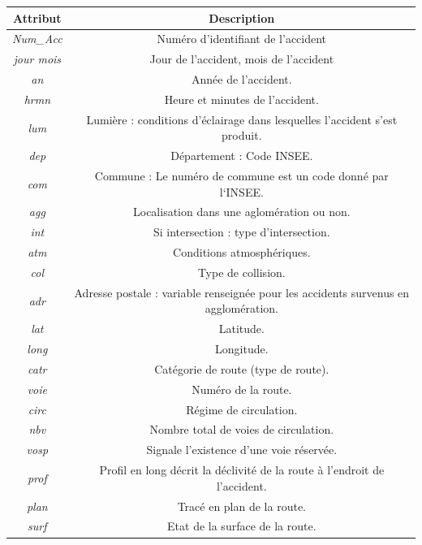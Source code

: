 \documentclass[]{article}
\begin{document}
    \begin{center}
        \begin{tabular}{ |c|c| }
            \hline
            \textbf{Attribut} & \textbf{Description} \\
            \hline
            \textit{Num\_Acc} & Numéro d'identifiant de l'accident \\
            \textit{jour mois} & Jour de l'accident, mois de l'accident \\
            \textit{an} & Année de l'accident. \\
            \textit{hrmn} & Heure et minutes de l'accident. \\
            \textit{lum} & Lumière : conditions d’éclairage dans lesquelles l'accident s'est produit. \\
            \textit{dep} & Département : Code INSEE. \\
            \textit{com} & Commune : Le numéro de commune est un code donné par l‘INSEE. \\
            \textit{agg} & Localisation dans une aglomération ou non. \\
            \textit{int} & Si intersection : type d'intersection. \\
            \textit{atm} & Conditions atmosphériques. \\
            \textit{col} & Type de collision. \\
            \textit{adr} & Adresse postale : variable renseignée pour les accidents survenus en agglomération. \\
            \textit{lat} & Latitude. \\
            \textit{long} & Longitude. \\
            \textit{catr} & Catégorie de route (type de route). \\  
            \textit{voie} & Numéro de la route. \\  
            \textit{circ} & Régime de circulation. \\  
            \textit{nbv} & Nombre total de voies de circulation. \\  
            \textit{vosp} & Signale l’existence d’une voie réservée. \\  
            \textit{prof} & Profil en long décrit la déclivité de la route à l'endroit de l'accident. \\  
            \textit{plan} & Tracé en plan de la route. \\  
            \textit{surf} & Etat de la surface de la route. \\  

\end{tabular}
\end{center}
\end{document}
